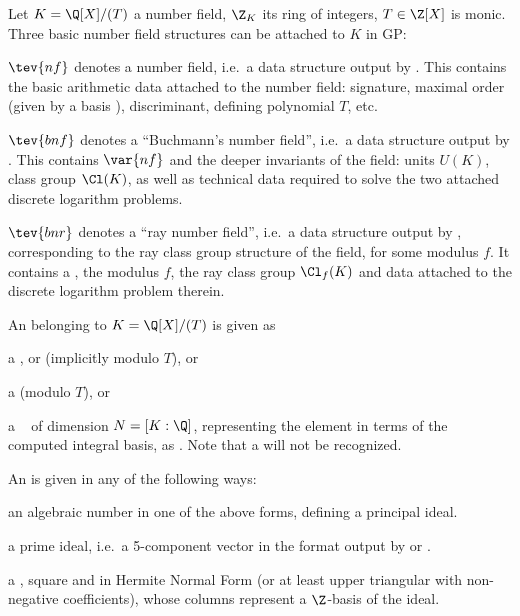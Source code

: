 Let $K = \Q[X] / (T)$ a number field, $\Z_K$ its ring of integers, $T\in\Z[X]$
is monic. Three basic number field structures can be attached to $K$ in
GP:

\item $\tev{nf}$ denotes a number field, i.e.~a data structure output by
. This contains the basic arithmetic data attached to the
number field: signature, maximal order (given by a basis ),
discriminant, defining polynomial $T$, etc.

\item $\tev{bnf}$ denotes a ``Buchmann's number field'', i.e.~a
data structure output by . This contains
$\var{nf}$ and the deeper invariants of the field: units $U(K)$, class group
$\Cl(K)$, as well as technical data required to solve the two attached
discrete logarithm problems.

\item $\tev{bnr}$ denotes a ``ray number field'', i.e.~a data structure
output by , corresponding to the ray class group structure of
the field, for some modulus $f$. It contains a , the modulus
$f$, the ray class group $\Cl_f(K)$ and data attached to
the discrete logarithm problem therein.


\noindent An  belonging to $K = \Q[X]/(T)$ is given as

\item a ,  or  (implicitly modulo $T$), or

\item a  (modulo $T$), or

\item a ~ of dimension $N = [K:\Q]$, representing
the element in terms of the computed integral basis, as
. Note that a 
will not be recognized.
\medskip

\noindent An  is given in any of the following ways:

\item an algebraic number in one of the above forms, defining a principal ideal.

\item a prime ideal, i.e.~a 5-component vector in the format output by
 or .

\item a , square and in Hermite Normal Form (or at least
upper triangular with non-negative coefficients), whose columns represent a
$\Z$-basis of the ideal.

